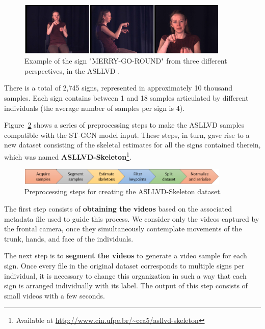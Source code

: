 \begin{figure}[!ht]
    \centering
    \includegraphics[width=0.9\textwidth]{images/asllvd_example}
    \caption{Example of the sign "MERRY-GO-ROUND" from three different perspectives, in the ASLLVD \cite[p. 2]{athitsos-asllvd-2008}.}
    \label{fig:asllvd-example}
\end{figure}

There is a total of 2,745 signs, represented in approximately 10 thousand samples. Each sign contains between 1 and 18 samples articulated by different individuals (the average number of samples per sign is 4). 

Figure~\ref{fig:preprocessamento} shows a series of preprocessing steps to make the ASLLVD samples compatible with the ST-GCN model input.  These steps, in turn, gave rise to a new dataset consisting of the skeletal estimates for all the signs contained therein, which was named \textbf{ASLLVD-Skeleton}\footnote{
   Available at \url{http://www.cin.ufpe.br/~cca5/asllvd-skeleton}
}.

\begin{figure}[ht!]
    \centering
    \includegraphics[width=0.9\textwidth]{images/dataset_preprocessing_en}
    \caption{Preprocessing steps for creating the ASLLVD-Skeleton dataset.}
    \label{fig:preprocessamento}
\end{figure}

The first step consists of \textbf{obtaining the videos} based on the associated metadata file used to guide this process. We consider only the videos captured by the frontal camera, once they simultaneously contemplate movements of the trunk, hands, and face of the individuals.

The next step is to \textbf{segment the videos} to generate a video sample for each sign. Once every file in the original dataset corresponds to multiple signs per individual, it is necessary to change this organization in such a way that each sign is arranged individually with its label. The output of this step consists of small videos with a few seconds.

